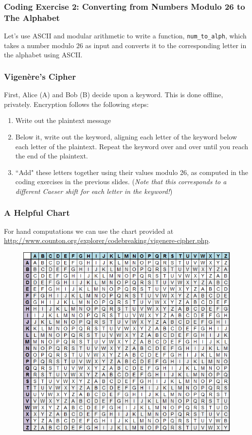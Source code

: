 \documentclass{beamer}
\newcommand{\<}{\langle}
\renewcommand{\>}{\rangle}
\begin{document}
\begin{frame}[fragile]
\frametitle{Coding Exercise 2: Converting from Numbers Modulo 26 to The Alphabet}

Let's use ASCII and modular arithmetic to write a function, \verb|num_to_alph|, which takes a number modulo $26$ as input and converts it to the corresponding letter in the alphabet using ASCII. 
\end{frame}

\begin{frame}
\frametitle{Vigen\`{e}re's Cipher}

First, Alice (A) and Bob (B) decide upon a keyword. This is done offline, privately. Encryption follows the following steps:
\begin{enumerate}[1)]
\item Write out the plaintext message
\item Below it, write out the keyword, aligning each letter of the keyword below each letter of the plaintext. Repeat the keyword over and over until you reach the end of the plaintext. 
\item ``Add" these letters together using their values modulo 26, as computed in the coding exercises in the previous slides. (\emph{Note that this corresponds to a different Caeser shift for each letter in the keyword!})
\end{enumerate}
\end{frame}

\begin{frame}
\frametitle{A Helpful Chart}

For hand computations we can use the chart provided at \url{http://www.counton.org/explorer/codebreaking/vigenere-cipher.php}. 
\begin{figure}
\includegraphics[scale=.4]{IMG/vignere.png}
\end{figure}
\end{frame}
\end{document}
